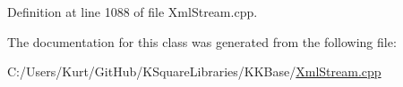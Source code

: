 Definition at line 1088 of file Xml\+Stream.\+cpp.



The documentation for this class was generated from the following file\+:\begin{DoxyCompactItemize}
\item 
C\+:/\+Users/\+Kurt/\+Git\+Hub/\+K\+Square\+Libraries/\+K\+K\+Base/\hyperlink{_xml_stream_8cpp}{Xml\+Stream.\+cpp}\end{DoxyCompactItemize}
